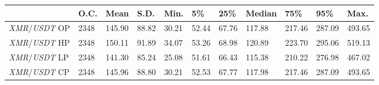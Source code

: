 \begin{tabular}{lllllllllll}
\toprule
 & \textbf{O.C.} & \textbf{Mean} & \textbf{S.D.} & \textbf{Min.} & \textbf{5\%} & \textbf{25\%} & \textbf{Median} & \textbf{75\%} & \textbf{95\%} & \textbf{Max.} \\
\midrule
\emph{XMR}/\emph{USDT} OP & 2348 & 145.90 & 88.82 & 30.21 & 52.44 & 67.76 & 117.88 & 217.46 & 287.09 & 493.65 \\
\emph{XMR}/\emph{USDT} HP & 2348 & 150.11 & 91.89 & 34.07 & 53.26 & 68.98 & 120.89 & 223.70 & 295.06 & 519.13 \\
\emph{XMR}/\emph{USDT} LP & 2348 & 141.30 & 85.24 & 25.08 & 51.61 & 66.43 & 115.38 & 210.22 & 276.98 & 467.02 \\
\emph{XMR}/\emph{USDT} CP & 2348 & 145.96 & 88.80 & 30.21 & 52.53 & 67.77 & 117.98 & 217.46 & 287.09 & 493.65 \\
\bottomrule
\end{tabular}
